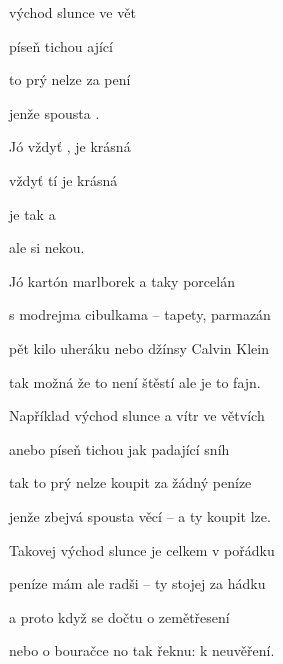 

\zs
{} východ slunce  ve vět  

 píseň tichou ající   

 to prý nelze  za  pení

jenže  spousta    . 
\ks

\zs
Jó vždyť ,  je krásná   

vždyť  tí je krásná   

 je tak  a  

ale  si  nekou.
\ks

\zs
Jó kartón marlborek a taky porcelán

s modrejma cibulkama -- tapety, parmazán

pět kilo uheráku nebo džínsy Calvin Klein

tak možná že to není štěstí ale je to fajn.
\ks

\zr
Například východ slunce a vítr ve větvích

anebo píseň tichou jak padající sníh

tak to prý nelze koupit za žádný peníze

jenže zbejvá spousta věcí -- a ty koupit lze.
\kr

\zs
Takovej východ slunce je celkem v pořádku

peníze mám ale radši -- ty stojej za hádku

a proto když se dočtu o zemětřesení

nebo o bouračce no tak řeknu: k neuvěření.
\ks

\zr  \kr  \zr  \kr

\kp























